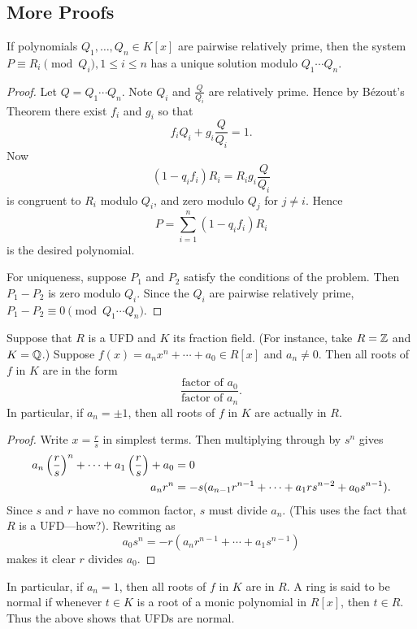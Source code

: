 \subsection{More Proofs}
\begin{thm}
If polynomials $Q_1,\ldots, Q_n\in K[x]$ are pairwise relatively prime, then the system $P\equiv R_i\pmod{Q_i}, 1\leq i\leq n$ has a unique solution modulo $Q_1\cdots Q_n$.
\end{thm}
\begin{proof}
Let $Q=Q_1\cdots Q_n$. Note $Q_i$ and $\frac{Q}{Q_i}$ are relatively prime.
Hence by B\'ezout's Theorem there exist $f_i$ and $g_i$ so that
\[
f_iQ_i+g_i\frac{Q}{Q_i}=1.
\]
Now 
\[(1-q_if_i)R_i=R_ig_i\frac{Q}{Q_i}\]
is congruent to $R_i$ modulo $Q_i$, and zero modulo $Q_j$ for $j\neq i$. Hence
\[
P=\sum_{i=1}^n(1-q_if_i)R_i
\]
is the desired polynomial.

For uniqueness, suppose $P_1$ and $P_2$ satisfy the conditions of the problem. Then $P_1-P_2$ is zero modulo $Q_i$. Since the $Q_i$ are pairwise relatively prime, $P_1-P_2\equiv 0\pmod{Q_1\cdots Q_n}$.
\end{proof}

\begin{thm}
Suppose that $R$ is a UFD and $K$ its fraction field. (For instance, take $R=\mathbb{Z}$ and $K=\mathbb{Q}$.) Suppose $f(x)=a_nx^n+\cdots +a_0\in R[x]$ and $a_n\neq 0$. Then all roots of $f$ in $K$ are in the form
\[
\frac{
\text{factor of }a_0}{\text{factor of }a_n}.
\]
In particular, if $a_n=\pm 1$, then all  roots of $f$ in $K$ are actually in $R$.
\end{thm}
\begin{proof}
Write $x=\frac rs$ in simplest terms. Then multiplying through by $s^n$ gives
\begin{align*}
a_n\left( {\frac{r}{s}} \right)^n+\cdots +a_1\left( {\frac{r}{s}} \right)+a_0&=0\\
a_nr^n&=-s(a_{n-1}r^{n-1}+\cdots +a_1rs^{n-2}+a_0s^{n-1}).
\end{align*}
Since $s$ and $r$ have no common factor, $s$ must divide $a_n$. (This uses the fact that $R$ is a UFD---how?). Rewriting as
\[
a_0s^n=-r(a_nr^{n-1}+\cdots +a_1s^{n-1})
\]
makes it clear $r$ divides $a_0$.
\end{proof}
\begin{rem}
In particular, if $a_n=1$, then all roots of $f$ in $K$ are in $R$. A ring is said to be normal if whenever $t\in K$ is a root of a monic polynomial in $R[x]$, then $t\in R$. Thus the above shows that UFDs are normal. 
\end{rem}
